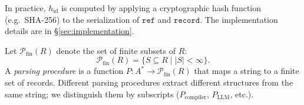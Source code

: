 In practice, $h_{\mathrm{id}}$ is computed by applying a cryptographic hash function (e.g.\ SHA-256) to the serialization of $\texttt{ref}$ and $\texttt{record}$. The implementation details are in \S\ref{sec:implementation}.

\begin{definition}[Parsing]
\label{def:parsing}
Let $\mathcal{P}_{\mathrm{fin}}(R)$ denote the set of finite subsets of $R$:
\[
\mathcal{P}_{\mathrm{fin}}(R) = \{ S \subseteq R \mid |S| < \infty \}.
\]
A \emph{parsing procedure} is a function $P : A^* \to \mathcal{P}_{\mathrm{fin}}(R)$ that maps a string to a finite set of records. Different parsing procedures extract different structures from the same string; we distinguish them by subscripts ($P_{\mathrm{compiler}}$, $P_{\mathrm{LLM}}$, etc.).
\end{definition}

